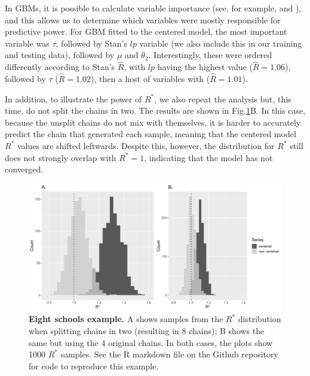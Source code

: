 \documentclass{article}
\begin{document}
In GBMs, it is possible to calculate variable importance (see, for example, \cite{friedman2001greedy} and \cite{greenwell2019package}), and this allows us to determine which variables were mostly responsible for predictive power. For GBM fitted to the centered model, the most important variable was $\tau$, followed by Stan's $lp$ variable (we also include this in our training and testing data), followed by $\mu$ and $\theta_2$. Interestingly, these were ordered differently according to Stan's $\hat{R}$, with $lp$ having the highest value ($\hat R = 1.06$), followed by $\tau$ ($\hat R = 1.02$), then a host of variables with ($\hat R = 1.01$).

In addition, to illustrate the power of $R^*$, we also repeat the analysis but, this time, do not split the chains in two. The results are shown in Fig.\ref{fig:eight_schools}B. In this case, because the unsplit chains do not mix with themselves, it is harder to accurately predict the chain that generated each sample, meaning that the centered model $R^*$ values are shifted leftwards. Despite this, however, the distribution for $R^*$ still does not strongly overlap with $R^*=1$, indicating that the model has not converged.

\begin{figure}[h]
	\centerline{\includegraphics[width=1.0\textwidth]{../output/eight_schools.pdf}}
	\caption{\textbf{Eight schools example.} A shows samples from the $R^*$ distribution when splitting chains in two (resulting in 8 chains); B shows the same but using the 4 original chains. In both cases, the plots show 1000 $R^*$ samples. See the R markdown file on the Github repository for code to reproduce this example.}
	\label{fig:eight_schools}
\end{figure}
\end{document}
